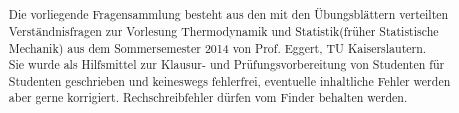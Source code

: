 \documentclass[12pt,a4paper,notitlepage]{report}
\author{\theauthor}
\date{}
\title{\textbf{\thetitle}\vspace{25mm}}
\numberwithin{equation}{section}
\begin{document}
\maketitle%
\vspace{50mm}
\begin{abstract}
 Die vorliegende Fragensammlung besteht aus den mit den Übungsblättern verteilten Verständnisfragen zur Vorlesung \glqq Thermodynamik und Statistik\grqq\xspace (früher \glqq Statistische Mechanik\grqq) aus dem Sommersemester 2014 von Prof. Eggert, TU Kaiserslautern.\\
Sie wurde als Hilfsmittel zur Klausur- und Prüfungsvorbereitung von Studenten für Studenten geschrieben und keineswegs fehlerfrei, eventuelle inhaltliche Fehler werden aber gerne korrigiert. Rechschreibfehler dürfen vom Finder behalten werden.
\end{abstract}
\tableofcontents%





















\end{document}

